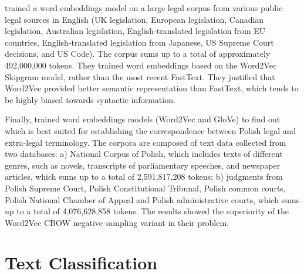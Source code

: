 \textcite{Chalkidis2019} trained a word embeddings model on a large legal corpus from various public legal sources in English (UK legislation, European legislation, Canadian legislation, Australian legislation, English-translated legislation from EU countries, English-translated legislation from Japanese, US Supreme Court decisions, and US Code). The corpus sums up to a total of approximately 492,000,000 tokens. They trained word embeddings based on the Word2Vec Skipgram model, rather than the most recent FastText. They justified that Word2Vec provided better semantic representation than FastText, which tends to be highly biased towards syntactic information.

Finally, \textcite{SmywiskiPohl2019} trained word embeddings models (Word2Vec and GloVe) to find out which is best suited for establishing the correspondence between Polish legal and extra-legal terminology. The corpora are composed of text data collected from two databases: a) National Corpus of Polish, which includes texts of different genres, such as novels, transcripts of parliamentary speeches, and newspaper articles, which sums up to a total of 2,591,817,208 tokens; b) judgments from Polish Supreme Court, Polish Constitutional Tribunal, Polish common courts, Polish National Chamber of Appeal and Polish administrative courts, which sums up to a total of 4,076,628,858 tokens. The results showed the superiority of the Word2Vec \gls{CBOW} negative sampling variant in their problem.




\section{Text Classification} \label{sec:related_classification}


